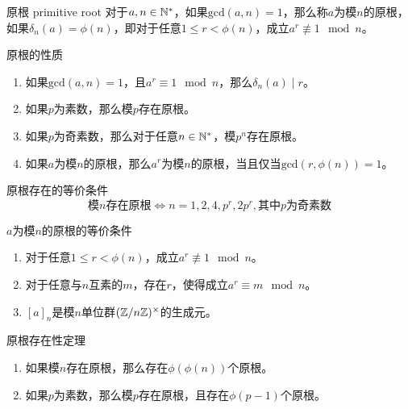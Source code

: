 \begin{definition}{原根 primitive root}
	对于$a,n\in\mathbb{N}^*$，如果$\mathrm{gcd}(a,n)=1$，那么称$a$为模$n$的原根，如果$\delta_n(a)=\phi(n)$，即对于任意$1\le r<\phi(n)$，成立$a^r\not\equiv 1\mod n$。
\end{definition}

\begin{proposition}{原根的性质}
	\begin{enumerate}
		\item 如果$\mathrm{gcd}(a,n)=1$，且$a^r\equiv 1\mod n$，那么$\delta_n(a)\mid r$。
		\item 如果$p$为素数，那么模$p$存在原根。
		\item  如果$p$为奇素数，那么对于任意$n\in\mathbb{N}^*$，模$p^n$存在原根。
		\item 如果$a$为模$n$的原根，那么$a^r$为模$n$的原根，当且仅当$\mathrm{gcd}(r,\phi(n))=1$。
	\end{enumerate}
\end{proposition}

\begin{theorem}{原根存在的等价条件}
	$$
	\text{模}n\text{存在原根}\iff n=1,2,4,p^r,2p^r, \text{其中} p \text{为奇素数}
	$$
\end{theorem}

\begin{theorem}{$a$为模$n$的原根的等价条件}
	\begin{enumerate}
		\item 对于任意$1\le r<\phi(n)$，成立$a^r\not\equiv 1\mod n$。
		\item 对于任意与$n$互素的$m$，存在$r$，使得成立$a^r\equiv m\mod n$。
		\item $[a]_{n}$是模$n$单位群$(\mathbb{Z}/n\mathbb{Z})^{\times}$的生成元。
	\end{enumerate}
\end{theorem}

\begin{theorem}{原根存在性定理}
	\begin{enumerate}
		\item 如果模$n$存在原根，那么存在$\phi(\phi(n))$个原根。
		\item 如果$p$为素数，那么模$p$存在原根，且存在$\phi(p-1)$个原根。
	\end{enumerate}
\end{theorem}

